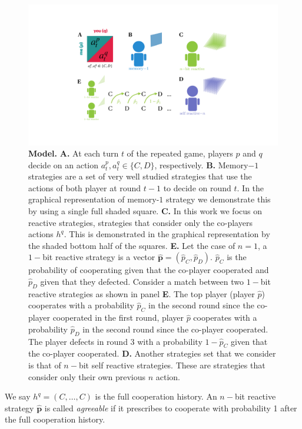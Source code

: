 \documentclass{article}
\theoremstyle{definition}
\begin{document}
\begin{figure}[h!]
    \centering
    \includegraphics[width=.75\textwidth]{figures/conceptual_figure_model.pdf}
    \caption{\textbf{Model.} \textbf{A.} At each turn $t$ of the repeated game,
    players \(p\) and \(q\) decide on an action \(a^{p}_{t}, a^{q}_{t} \in \{C,
    D\}\), respectively. \textbf{B.} Memory$-1$ strategies are a set of very well
    studied strategies that use the actions of both player at round $t-1$ to
    decide on round $t$. In the graphical representation of memory-$1$ strategy
    we demonstrate this by using a single full shaded square. \textbf{C.} In this work we
    focus on reactive strategies, strategies that consider only the
    co-players actions $h^q$. This is demonstrated in the graphical representation
    by the shaded bottom half of the squares. \textbf{E.} Let the case of $n=1$, a $1-$bit
    reactive strategy is a vector $\mathbf{\hat{p}}=(\hat{p}_{C}, \hat{p}_{D})$. $\hat{p}_C$
    is the probability of cooperating given that the co-player cooperated and $\hat{p}_D$
    given that they defected. Consider a 
    match between two $1-$bit reactive strategies as shown in panel \textbf{E}. The top
    player (player $\hat{p}$) cooperates with a probability $\hat{p}_C$ in the
    second round since the co-player cooperated in the first round, player
    $\hat{p}$ cooperates with a probability $\hat{p}_D$ in the second round
    since the co-player cooperated. The player defects in round 3 with a probability $1 -
    \hat{p}_C$ given that the co-player cooperated. \textbf{D.} Another strategies set that
    we consider is that of $n-$bit self reactive strategies. These are strategies that
    consider only their own previous $n$ action.}
\end{figure}

We say $\!h^q\!=\!(C,\ldots,C)$ is the full cooperation history. An $n-$bit
reactive strategy $\mathbf{\hat{p}}$ is called {\it agreeable} if it prescribes to
cooperate with probability 1 after the full cooperation history.
\end{document}
